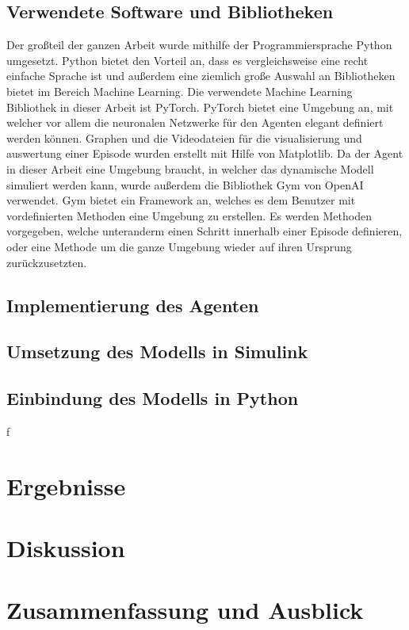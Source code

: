 \documentclass[]{iat}
\begin{document}
\section{Verwendete Software und Bibliotheken}
Der großteil der ganzen Arbeit wurde mithilfe der Programmiersprache Python umgesetzt. Python bietet den Vorteil an, dass es vergleichsweise eine recht einfache Sprache ist und außerdem eine ziemlich große Auswahl an Bibliotheken bietet im Bereich Machine Learning. Die verwendete Machine Learning Bibliothek in dieser Arbeit ist PyTorch. PyTorch bietet eine Umgebung an, mit welcher vor allem die neuronalen Netzwerke für den Agenten elegant definiert werden können. Graphen und die Videodateien für die visualisierung und auswertung einer Episode wurden erstellt mit Hilfe von Matplotlib. Da der Agent in dieser Arbeit eine Umgebung braucht, in welcher das dynamische Modell simuliert werden kann, wurde außerdem die Bibliothek Gym von OpenAI verwendet. Gym bietet ein Framework an, welches es dem Benutzer mit vordefinierten Methoden eine Umgebung zu erstellen. Es werden Methoden vorgegeben, welche unteranderm einen Schritt innerhalb einer Episode definieren, oder eine Methode um die ganze Umgebung wieder auf ihren Ursprung zurückzusetzten.
\section{Implementierung des Agenten}
\section{Umsetzung des Modells in Simulink}
\section{Einbindung des Modells in Python}
f
\chapter{Ergebnisse}

\chapter{Diskussion}

\chapter{Zusammenfassung und Ausblick}
\end{document}
